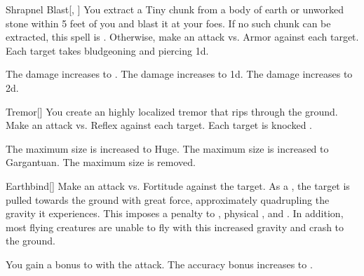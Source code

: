 \lowercase{\hypertarget{spell:Shrapnel Blast}{}}\label{spell:Shrapnel Blast}
\begin{freeability}[Rank 1]{\hypertarget{spell:Shrapnel Blast}{Shrapnel Blast}}[, ]
You extract a Tiny chunk from a body of earth or unworked stone within 5 feet of you and blast it at your foes.
If no such chunk can be extracted, this spell is .
Otherwise, make an attack vs. Armor against each target.
\hit Each target takes bludgeoning and piercing  \minus1d.

\rankline
{} The damage increases to .
 The damage increases to  \plus1d.
 The damage increases to  \plus2d.
\end{freeability}
\vspace{0.25em}



\lowercase{\hypertarget{spell:Tremor}{}}\label{spell:Tremor}
\begin{freeability}[Rank 1]{\hypertarget{spell:Tremor}{Tremor}}[]
You create an highly localized tremor that rips through the ground.
Make an attack vs. Reflex against each target.
\hit Each target is knocked .

\rankline
{} The maximum size is increased to Huge.
 The maximum size is increased to Gargantuan.
 The maximum size is removed.
\end{freeability}
\vspace{0.25em}



\lowercase{\hypertarget{spell:Earthbind}{}}\label{spell:Earthbind}
\begin{freeability}[Rank 3]{\hypertarget{spell:Earthbind}{Earthbind}}[]
Make an attack vs. Fortitude against the target.
\hit As a , the target is pulled towards the ground with great force, approximately quadrupling the gravity it experiences.
This imposes a  penalty to , physical , and .
In addition, most flying creatures are unable to fly with this increased gravity and crash to the ground.

\rankline
{} You gain a  bonus to  with the attack.
 The accuracy bonus increases to .
\end{freeability}
\vspace{0.25em}



